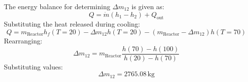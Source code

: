 The energy balance for determining \( \Delta m_{12} \) is given as:  
\[
Q = \dot{m} (h_1 - h_2) + Q_{\text{out}}
\]  
Substituting the heat released during cooling:  
\[
Q = m_{\text{Reactor}} h_{f}(T=20) - \Delta m_{12} h(T=20) - (m_{\text{Reactor}} - \Delta m_{12}) h(T=70)
\]  
Rearranging:  
\[
\Delta m_{12} = m_{\text{Reactor}} \frac{h(70) - h(100)}{h(20) - h(70)}
\]  
Substituting values:  
\[
\Delta m_{12} = 2765.08 \, \text{kg}
\]